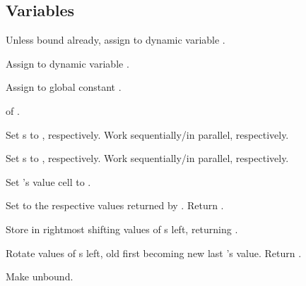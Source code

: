 \subsection{Variables}

\begin{LIST}{1cm}

  {
  Unless bound already, assign  to dynamic variable
  . 
  }

  {
  Assign  to dynamic variable .
  }

  {
  Assign  to global constant .
  }

  {
   of .
  }

  {
  Set s to , respectively. Work sequentially/in
  parallel, respectively. 
  }

  {
  Set s to , respectively. Work sequentially/in
  parallel, respectively. 
  }

  {
  Set 's value cell to .
  }

  {
  Set  to the respective values returned by
  . Return .
  }

  {
  Store  in rightmost  shifting values of
  s left, returning . 
  }

  {
  Rotate values of s left, old first becoming new last
  's value. Return \retval{\NIL}.
  }

  {
  Make  unbound.
  }


\end{LIST}
